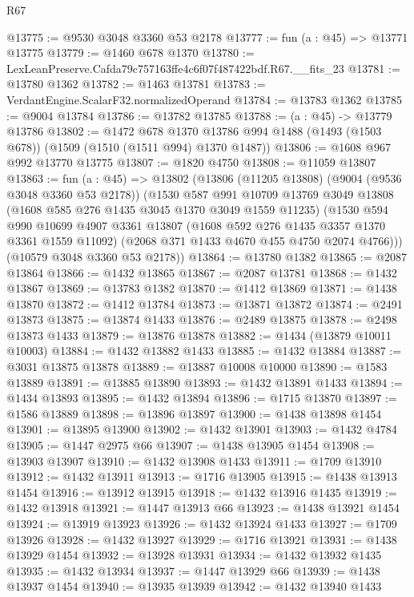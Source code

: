 \begin{lexlean}{R67}
\begin{coremodule}
@13775 := @9530 @3048 @3360 @53 @2178
@13777 := fun (a : @45) => @13771 @13775
@13779 := @1460 @678 @1370
@13780 := LexLeanPreserve.Cafda79c757163ffe4c6f07f487422bdf.R67.__fits_23
@13781 := @13780 @1362
@13782 := @1463 @13781
@13783 := VerdantEngine.ScalarF32.normalizedOperand
@13784 := @13783 @1362
@13785 := @9004 @13784
@13786 := @13782 @13785
@13788 := (a : @45) -> @13779 @13786
@13802 := @1472
    @678
    @1370
    @13786
    @994
    @1488
    (@1493 (@1503 @678))
    (@1509 (@1510 (@1511 @994) @1370 @1487))
@13806 := @1608 @967 @992 @13770 @13775
@13807 := @1820 @4750
@13808 := @11059 @13807
@13863 := fun (a : @45) =>
  @13802
    (@13806
      (@11205 @13808)
      (@9004 (@9536 @3048 @3360 @53 @2178))
      (@1530
        @587
        @991
        @10709
        @13769
        @3049
        @13808
        (@1608 @585 @276 @1435 @3045 @1370 @3049 @1559 @11235)
        (@1530
          @594
          @990
          @10699
          @4907
          @3361
          @13807
          (@1608 @592 @276 @1435 @3357 @1370 @3361 @1559 @11092)
          (@2068 @371 @1433 @4670 @455 @4750 @2074 @4766)))
      (@10579 @3048 @3360 @53 @2178))
@13864 := @13780 @1382
@13865 := @2087 @13864
@13866 := @1432 @13865
@13867 := @2087 @13781
@13868 := @1432 @13867
@13869 := @13783 @1382
@13870 := @1412 @13869
@13871 := @1438 @13870
@13872 := @1412 @13784
@13873 := @13871 @13872
@13874 := @2491 @13873
@13875 := @13874 @1433
@13876 := @2489 @13875
@13878 := @2498 @13873 @1433
@13879 := @13876 @13878
@13882 := @1434 (@13879 @10011 @10003)
@13884 := @1432 @13882 @1433
@13885 := @1432 @13884
@13887 := @3031 @13875 @13878
@13889 := @13887 @10008 @10000
@13890 := @1583 @13889
@13891 := @13885 @13890
@13893 := @1432 @13891 @1433
@13894 := @1434 @13893
@13895 := @1432 @13894
@13896 := @1715 @13870
@13897 := @1586 @13889
@13898 := @13896 @13897
@13900 := @1438 @13898 @1454
@13901 := @13895 @13900
@13902 := @1432 @13901
@13903 := @1432 @4784
@13905 := @1447 @2975 @66
@13907 := @1438 @13905 @1454
@13908 := @13903 @13907
@13910 := @1432 @13908 @1433
@13911 := @1709 @13910
@13912 := @1432 @13911
@13913 := @1716 @13905
@13915 := @1438 @13913 @1454
@13916 := @13912 @13915
@13918 := @1432 @13916 @1435
@13919 := @1432 @13918
@13921 := @1447 @13913 @66
@13923 := @1438 @13921 @1454
@13924 := @13919 @13923
@13926 := @1432 @13924 @1433
@13927 := @1709 @13926
@13928 := @1432 @13927
@13929 := @1716 @13921
@13931 := @1438 @13929 @1454
@13932 := @13928 @13931
@13934 := @1432 @13932 @1435
@13935 := @1432 @13934
@13937 := @1447 @13929 @66
@13939 := @1438 @13937 @1454
@13940 := @13935 @13939
@13942 := @1432 @13940 @1433

\end{coremodule}
\end{lexlean}
